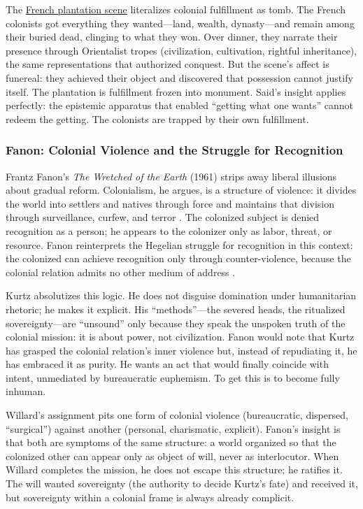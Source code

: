 The \hyperref[scene:french-plantation]{French plantation scene} literalizes colonial
fulfillment as tomb. The French colonists got everything they wanted---land, wealth,
dynasty---and remain among their buried dead, clinging to what they won. Over dinner, they
narrate their presence through Orientalist tropes (civilization, cultivation, rightful
inheritance), the same representations that authorized conquest. But the scene's affect is
funereal: they achieved their object and discovered that possession cannot justify itself. The
plantation is fulfillment frozen into monument. Said's insight applies perfectly: the
epistemic apparatus that enabled ``getting what one wants'' cannot redeem the getting. The
colonists are trapped by their own fulfillment.

\subsubsection*{Fanon: Colonial Violence and the Struggle for Recognition}
Frantz Fanon's \textit{The Wretched of the Earth} (1961) strips away liberal illusions about
gradual reform. Colonialism, he argues, is a structure of violence: it divides the world into
settlers and natives through force and maintains that division through surveillance, curfew,
and terror \parencite{FanonWretched2004}. The colonized subject is denied recognition as a
person; he appears to the colonizer only as labor, threat, or resource. Fanon reinterprets the
Hegelian struggle for recognition in this context: the colonized can achieve recognition only
through counter-violence, because the colonial relation admits no other medium of address
\parencite{FanonWretched2004}.

Kurtz absolutizes this logic. He does not disguise domination under humanitarian rhetoric; he
makes it explicit. His ``methods''---the severed heads, the ritualized sovereignty---are
``unsound'' only because they speak the unspoken truth of the colonial mission: it is about
power, not civilization. Fanon would note that Kurtz has grasped the colonial relation's inner
violence but, instead of repudiating it, he has embraced it as purity. He wants an act that
would finally coincide with intent, unmediated by bureaucratic euphemism. To get this is to
become fully inhuman.

Willard's assignment pits one form of colonial violence (bureaucratic, dispersed, ``surgical'')
against another (personal, charismatic, explicit). Fanon's insight is that both are symptoms
of the same structure: a world organized so that the colonized other can appear only as object
of will, never as interlocutor. When Willard completes the mission, he does not escape this
structure; he ratifies it. The will wanted sovereignty (the authority to decide Kurtz's fate)
and received it, but sovereignty within a colonial frame is always already complicit.

